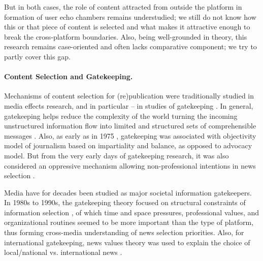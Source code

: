 But in both cases, the role of content attracted from outside the platform in formation of user echo chambers remains understudied; we still do not know how this or that piece of content is selected and what makes it attractive enough to break the cross-platform boundaries. Also, being well-grounded in theory, this research remains case-oriented and often lacks comparative component; we try to partly cover this gap.

\paragraph{Content Selection and Gatekeeping.} Mechanisms of content selection for (re)publication were traditionally studied in media effects research, and in particular -- in studies of gatekeeping \cite{White1950}. In general, gatekeeping helps reduce the complexity of the world turning the incoming unstructured information flow into limited and structured sets of comprehensible messages \cite{Singer}. Also, as early as in 1975 \cite{Janowitz}, gatekeeping was associated with objectivity model of journalism based on impartiality and balance, as opposed to advocacy model. But from the very early days of gatekeeping research, it was also considered an oppressive mechanism allowing non-professional intentions in news selection \cite{Mills}.

Media have for decades been studied as major societal information gatekeepers. In 1980s to 1990s, the gatekeeping theory focused on structural constraints of information selection \cite{DonahueOlienTichenor}, of which time and space pressures, professional values, and organizational routines seemed to be more important than the type of platform, thus forming cross-media understanding of news selection priorities. Also, for international gatekeeping, news values theory was used to explain the choice of local/national vs. international news \cite{RobertsBantimaroudis}.

